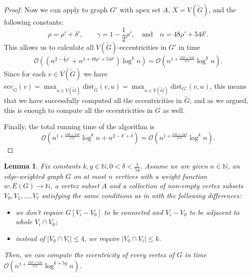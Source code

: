 \documentclass[11pt,a4paper]{article}
\newtheorem{lemma}{Lemma}[section]
\newcommand{\Oh}{\mathcal{O}}
\newcommand{\dist}{\mathrm{dist}}
\newcommand{\ecc}{\mathrm{ecc}}
\renewcommand{\leq}{\leqslant}
\begin{document}
\begin{proof}
Now we can apply  to graph $G'$ with apex set $A$, $X = V(\widetilde{G})$, and the following constants: $$\rho = \rho' + \delta',\qquad \gamma = 1 - \frac{1}{2}\rho',\quad \textrm{and}\quad \alpha = 48\rho' + 54 \delta'.$$ This allows us to calculate all $V(\widetilde{G})$-eccentricities in $G'$ in time
$$
\Oh \left( \left(
	n^{ 2 - \frac{1}{2} \rho' } +
	n^{ 1 + 48\rho' + 54 \delta' }
\right) \log^k n \right) =
\Oh \left( n^{1 + \frac{150 + 54 \delta}{151}} \log^k n \right).
$$
Since for each $v\in V(\widetilde{G})$ we have $\ecc_{\widetilde{G}}(v) = \max_{u \in V(\widetilde{G})} \dist_{\widetilde{G}}(v, u) = \max_{u \in V(\widetilde{G})} \dist_{G'}(v, u)$, this means that we have successfully computed all the eccentricities in $\widetilde{G}$; and as we argued, this is enough to compute all the eccentricities in $G$ as well.

Finally, the total running time of the algorithm is
$$
\Oh \left( n^{1 + \frac{150 + 54 \delta}{151}} \log^k n + n^{2 - \delta' + \delta} \right) =
\Oh \left( n^{1 + \frac{150 + 54 \delta}{151}} \log^k n \right).
$$\qedhere
\end{proof}


\begin{lemma}\label{l:star2}
Fix constants $k, g \in \mathbb{N}, 0 < \delta < \frac{1}{54}$. Assume we are given $n \in \mathbb{N}$, an edge-weighted graph $G$ on at most $n$ vertices with a weight function $w \colon E(G) \to \mathbb{N}$, a vertex subset $A$ and a collection of non-empty vertex subsets $V_0, V_1, \dots, V_\ell$ satisfying the same conditions as in  with the following differences:
\begin{itemize}
	\item we don't require $G[V_i - V_0]$ to be connected and $V_i - V_0$ to be adjacent to whole $V_i \cap V_0$;
	\item instead of $|V_0 \cap V_i| \leq 4$, we require $|V_0 \cap V_i| \leq k$.
\end{itemize}
Then, we can compute the eccentricity of every vertex of $G$ in time $\Oh \left( n^{1 + \frac{150 + 54 \delta}{151}} \log^{k + 5g} n \right)$.
\end{lemma}
\end{document}
